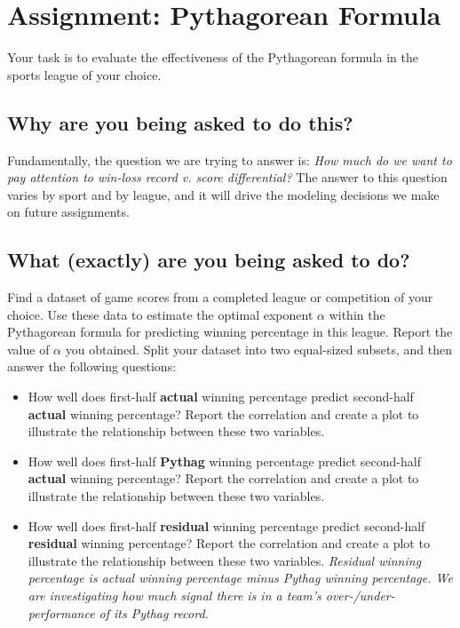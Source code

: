 \documentclass{article}
\begin{document}
  \section*{\sc Assignment: Pythagorean Formula}

    Your task is to evaluate the effectiveness of the Pythagorean formula in the sports league of your choice.
  
    \subsection*{\sc Why are you being asked to do this?}

      Fundamentally, the question we are trying to answer is: {\it How much do we want to pay attention to win-loss record v. score differential?} The answer to this question varies by sport and by league, and it will drive the modeling decisions we make on future assignments.

    \subsection*{\sc What (exactly) are you being asked to do?}

      Find a dataset of game scores from a completed league or competition of your choice. Use these data to estimate the optimal exponent $\alpha$ within the Pythagorean formula for predicting winning percentage in this league. Report the value of $\alpha$ you obtained. Split your dataset into two equal-sized subsets, and then answer the following questions:
      \begin{itemize}
        \item How well does first-half {\bf actual} winning percentage predict second-half {\bf actual} winning percentage? Report the correlation and create a plot to illustrate the relationship between these two variables.
        \item How well does first-half {\bf Pythag} winning percentage predict second-half {\bf actual} winning percentage? Report the correlation and create a plot to illustrate the relationship between these two variables.
        \item How well does first-half {\bf residual} winning percentage predict second-half {\bf residual} winning percentage? Report the correlation and create a plot to illustrate the relationship between these two variables. {\it Residual winning percentage is actual winning percentage minus Pythag winning percentage. We are investigating how much signal there is in a team's over-/under-performance of its Pythag record.}
      \end{itemize}
      
\end{document}
